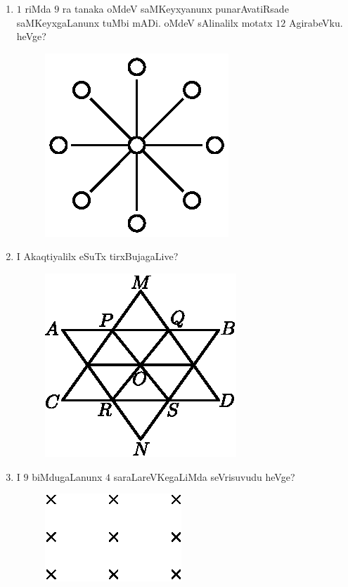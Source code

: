 \begin{enumerate}
\item $1$ riMda $9$ ra tanaka oMdeV saMKeyxyanunx punarAvatiRsade saMKeyxgaLanunx tuMbi mADi. oMdeV sAlinalilx motatx $12$ AgirabeVku. heVge?
\begin{figure}[H]
\centering
\includegraphics{src/figures/exr28.eps}
\end{figure}



\item I Akaqtiyalilx eSuTx tirxBujagaLive?
\begin{figure}[H]
\centering
\includegraphics{src/figures/exr29.eps}
\end{figure}

\item I $9$ biMdugaLanunx $4$ saraLareVKegaLiMda seVrisuvudu heVge?
\begin{figure}[H]
\centering
\includegraphics{src/figures/exr30.eps}
\end{figure}


\end{enumerate}
